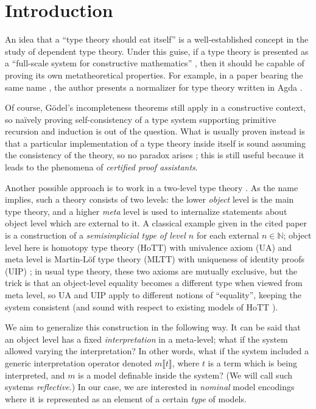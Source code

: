 \section{Introduction}

An idea that a ``type theory should eat itself'' is a
well-established concept in the study of dependent type
theory. Under this guise, if a type theory is presented
as a ``full-scale system for constructive mathematics''
\cite{martinlof1984intuitionistic,
martinlof1982constructive}, then it should be capable of
proving its own metatheoretical properties. For example,
in a paper bearing the same name \cite{chapman2009type},
the author presents a normalizer for type theory written
in Agda \cite{norell2007towards,agda2024manual}.

Of course, G\"odel's incompleteness theorems
\cite{godel1931formal} still apply in a constructive
context, so na\"ively proving self-consistency of a type
system supporting primitive recursion and induction is
out of the question. What is usually proven instead is that
a particular implementation of a type theory inside
itself is sound assuming the consistency of the theory,
so no paradox arises \cite{barras1999autovalidation,
sozeau2020coqcoqcorrect,carneiro2024lean4lean}; this is
still useful because it leads to the phenomena of
\emph{certified proof assistants}.

Another possible approach is to work in a two-level type
theory \cite{annenkov2023twolevel,voevodsky2013hts}. As
the name implies, such a theory consists of two levels:
the lower \emph{object} level is the main type theory,
and a higher \emph{meta} level is used to internalize
statements about object level which are external to it.
A classical example given in the cited paper is a
construction of a \emph{semisimplicial type of level
$n$} for each external $n\in\mathbb{N}$; object level
here is homotopy type theory (HoTT) with univalence
axiom (UA) \cite{hottbook,kapulkin2021simplicial} and
meta level is Martin-L\"of type theory (MLTT) with
uniqueness of identity proofs (UIP)
\cite{streicher1993investigations,hofmann1998groupoid};
in usual type theory, these two axioms are mutually
exclusive, but the trick is that an object-level
equality becomes a different type when viewed from meta
level, so UA and UIP apply to different notions of
``equality'', keeping the system consistent (and sound
with respect to existing models of HoTT
\cite{annenkov2023twolevel,kapulkin2021simplicial,
capriotti2016models}).

We aim to generalize this construction in the following
way. It can be said that an object level has a fixed
\emph{interpretation} in a meta-level; what if the
system allowed varying the interpretation? In other
words, what if the system included a generic
interpretation operator denoted $m\llbracket t
\rrbracket$, where $t$ is a term which is being
interpreted, and $m$ is a model definable inside the
system? (We will call such systems \emph{reflective}.)
In our case, we are interested in \emph{nominal}
model encodings where it is represented as an element of
a certain \emph{type} of models.

